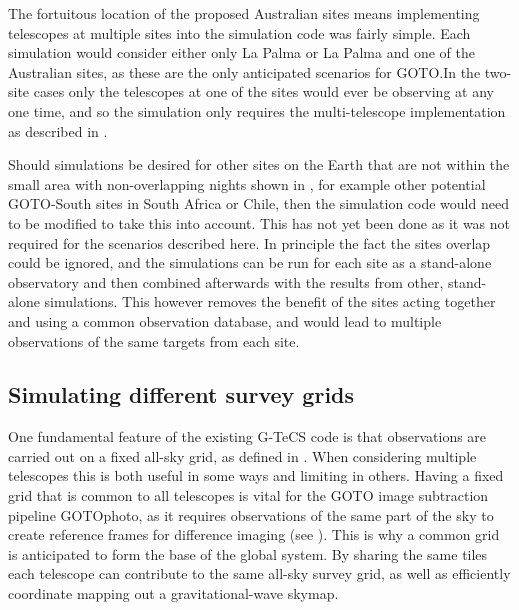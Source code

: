 \begin{colsection}
\begin{colsection}
The fortuitous location of the proposed Australian sites means implementing telescopes at multiple sites into the simulation code was fairly simple. Each simulation would consider either only La Palma or La Palma and one of the Australian sites, as these are the only anticipated scenarios for GOTO.\@ In the two-site cases only the telescopes at one of the sites would ever be observing at any one time, and so the simulation only requires the multi-telescope implementation as described in .

Should simulations be desired for other sites on the Earth that are not within the small area with non-overlapping nights shown in , for example other potential GOTO-South sites in South Africa or Chile, then the simulation code would need to be modified to take this into account. This has not yet been done as it was not required for the scenarios described here. In principle the fact the sites overlap could be ignored, and the simulations can be run for each site as a stand-alone observatory and then combined afterwards with the results from other, stand-alone simulations. This however removes the benefit of the sites acting together and using a common observation database, and would lead to multiple observations of the same targets from each site.

\end{colsection}


\subsection{Simulating different survey grids}
\label{sec:multi_grid_scheduling}
\begin{colsection}

One fundamental feature of the existing G-TeCS code is that observations are carried out on a fixed all-sky grid, as defined in . When considering multiple telescopes this is both useful in some ways and limiting in others. Having a fixed grid that is common to all telescopes is vital for the GOTO image subtraction pipeline GOTOphoto, as it requires observations of the same part of the sky to create reference frames for difference imaging (see ). This is why a common grid is anticipated to form the base of the global system. By sharing the same tiles each telescope can contribute to the same all-sky survey grid, as well as efficiently coordinate mapping out a gravitational-wave skymap.


\end{colsection}
\end{colsection}
